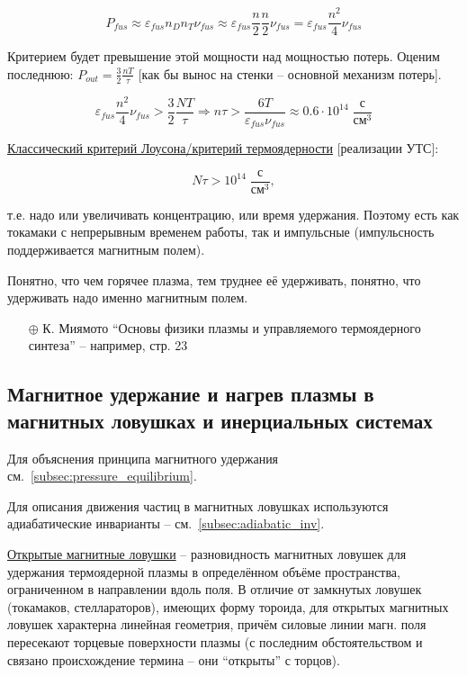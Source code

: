 \documentclass[10pt, a4paper]{article}
\begin{document}
\begin{equation*}
	P_{fus} \approx \varepsilon_{fus}n_D n_T \nu_{fus} \approx \varepsilon_{fus}\frac{n}{2} \frac{n}{2} \nu_{fus} = \varepsilon_{fus}\frac{n^2}{4} \nu_{fus}
\end{equation*}

Критерием будет превышение этой мощности над мощностью потерь. Оценим последнюю: $P_{out} = \frac{3}{2}\frac{nT}{\tau}$ [как бы вынос на стенки -- основной механизм потерь].

\begin{equation*}
	\varepsilon_{fus}\frac{n^2}{4} \nu_{fus} > \frac{3}{2}\frac{NT}{\tau} \Rightarrow n\tau > \frac{6T}{\varepsilon_{fus}\nu_{fus}}\approx 0.6\cdot 10^{14}\;\frac{\text{с}}{\text{см}^3}
\end{equation*}

\uline{Классический критерий Лоусона/критерий термоядерности} [реализации УТС]: 

\begin{equation*}
	N\tau>10^{14}\;\frac{\text{с}}{\text{см}^3},
\end{equation*}

т.е. надо или увеличивать концентрацию, или время удержания. Поэтому есть как токамаки с непрерывным временем работы, так и импульсные (импульсность поддерживается магнитным полем).

Понятно, что чем горячее плазма, тем труднее её удерживать, понятно, что удерживать надо именно магнитным полем.

\begin{itemize}
	\item[$\oplus$] К. Миямото ``Основы физики плазмы и управляемого термоядерного синтеза'' -- например, стр. 23
\end{itemize}

\subsection{Магнитное удержание и нагрев плазмы в магнитных ловушках и инерциальных системах} \label{subsec:mirror_traps}

Для объяснения принципа магнитного удержания см.~\ref{subsec:pressure_equilibrium}.

Для описания движения частиц в магнитных ловушках используются адиабатические инварианты -- см.~\ref{subsec:adiabatic_inv}.

\uline{Открытые магнитные ловушки} -- разновидность магнитных ловушек для удержания термоядерной плазмы в определённом объёме пространства, ограниченном в направлении вдоль поля. В отличие от замкнутых ловушек (токамаков, стеллараторов), имеющих форму тороида, для открытых магнитных ловушек характерна линейная геометрия, причём силовые линии магн. поля пересекают торцевые поверхности плазмы (с последним обстоятельством и связано происхождение термина -- они ``открыты'' с торцов).
\end{document}
